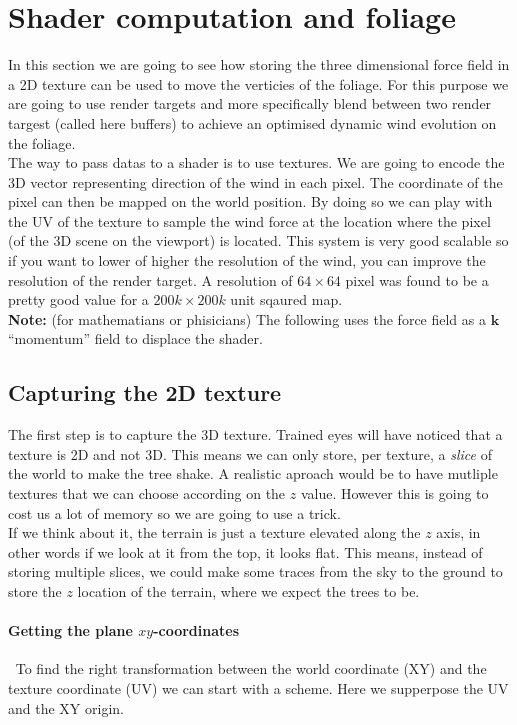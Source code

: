 \documentclass[../main.tex]{subfile}
\begin{document}
\section{Shader computation and foliage}
In this section we are going to see how storing the three dimensional force field in a 2D texture can be used to move the verticies of the foliage.
For this purpose we are going to use render targets and more specifically blend between two render targest (called here buffers) to achieve an
optimised dynamic wind evolution on the foliage.\\

The way to pass datas to a shader is to use textures. We are going to encode the 3D vector representing direction of the wind in each pixel. The coordinate 
of the pixel can then be mapped on the world position. By doing so we can play with the UV of the texture to sample the wind force at the location where the pixel 
(of the 3D scene on the viewport) is located. This system is very good scalable so if you want to lower of higher the resolution of the wind, you can improve the resolution
of the render target. A resolution of $64\times64$ pixel was found to be a pretty good value for a $200k\times200k$ unit sqaured map.\\

\textbf{Note:} (for mathematians or phisicians) The following uses the force field as a $\bm{k}$ ``momentum'' field to displace the shader.

\subsection{Capturing the 2D texture}
The first step is to capture the 3D texture. Trained eyes will have noticed that a texture is 2D and not 3D. This means we can only store, per texture, a \textit{slice} of the world 
to make the tree shake. A realistic aproach would be to have mutliple textures that we can choose according on the $z$ value. However this is going to cost
us a lot of memory so we are going to use a trick.\\

If we think about it, the terrain is just a texture elevated along the $z$ axis, in other words if we look at it from the top, it looks flat. This means, instead of 
storing multiple slices, we could make some traces from the sky to the ground to store the $z$ location of the terrain, where we expect the trees to be.\\

\paragraph{Getting the plane $xy$-coordinates} $~$ To find the right transformation between the world coordinate (XY) and the texture coordinate (UV) we can start with a scheme.
Here we supperpose the UV and the XY origin.\\
\end{document}

